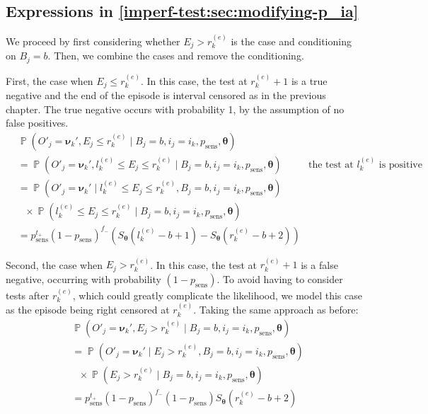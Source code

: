 \documentclass[12pt]{article}
\DeclareMathOperator{\prob}{\mathbb{P}}
\renewcommand{\vec}[1]{\bm{#1}}
\newcommand{\psens}{p_\text{sens}}
\newcommand{\sched}{\mathbb{T}}
\begin{document}
\subsection{Expressions in \cref{imperf-test:sec:modifying-p_ia}} \label{sec:p-ia-dash}

We proceed by first considering whether $E_j > r_k^{(e)}$ is the case and conditioning on $B_j = b$.
Then, we combine the cases and remove the conditioning.

First, the case when $E_j \leq r_k^{(e)}$.
In this case, the test at $r_k^{(e)}+1$ is a true negative and the end of the episode is interval censored as in the previous chapter.
The true negative occurs with probability 1, by the assumption of no false positives.
\begin{align}
&\prob(O'_j = \vec{\nu}_k', E_j \leq r_k^{(e)} \mid B_j = b, i_j = i_k, \psens, \vec{\theta}) \\
&= \prob(O'_j = \vec{\nu}_k', l_k^{(e)} \leq E_j \leq r_k^{(e)} \mid B_j = b, i_j = i_k, \psens, \vec{\theta}) &\text{the test at $l_k^{(e)}$ is positive} \\
&= \prob(O'_j = \vec{\nu}_k' \mid l_k^{(e)} \leq E_j \leq r_k^{(e)}, B_j = b, i_j = i_k, \psens, \vec{\theta}) \\
&\ \ \  \times \prob(l_k^{(e)} \leq E_j \leq r_k^{(e)} \mid B_j = b, i_j = i_k, \psens, \vec{\theta}) \\
&= p_\text{sens}^{t_+} (1 - p_\text{sens})^{f_-} \left( S_{\vec{\theta}}(l_k^{(e)} - b + 1) - S_{\vec{\theta}}(r_k^{(e)} - b + 2) \right)
\label{imperf-test:eq:ll-ei-lt-ri}
\end{align}

Second, the case when $E_j > r_k^{(e)}$.
In this case, the test at $r_k^{(e)}+1$ is a false negative, occurring with probability $(1 - p_\text{sens})$.
To avoid having to consider tests after $r_k^{(e)}$, which could greatly complicate the likelihood, we model this case as the episode being right censored at $r_k^{(e)}$.
Taking the same approach as before:
\begin{align}
&\prob(O'_j = \vec{\nu}_k', E_j > r_k^{(e)} \mid B_j = b, i_j = i_k, \psens, \vec{\theta}) \\
&= \prob(O'_j = \vec{\nu}_k' \mid E_j > r_k^{(e)}, B_j = b, i_j = i_k, \psens, \vec{\theta}) \\
  &\ \ \  \times \prob(E_j > r_k^{(e)} \mid B_j = b, i_j = i_k, \psens, \vec{\theta}) \\
&= p_\text{sens}^{t_+} (1 - p_\text{sens})^{f_-} (1 - p_\text{sens}) S_{\vec{\theta}}(r_k^{(e)} - b + 2)
\label{imperf-test:eq:ll-ei-gt-ri}
\end{align}
\end{document}
